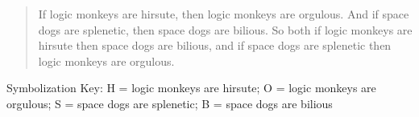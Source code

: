\documentclass[12pt]{article}
\begin{document}
\begin{enumerate}
\begin{quote}
If logic monkeys are hirsute, then logic monkeys are orgulous. And if space dogs are splenetic, then space dogs are bilious. So both if logic monkeys are hirsute then space dogs are bilious, and if space dogs are splenetic then logic monkeys are orgulous. 
\end{quote}

Symbolization Key: H = logic monkeys are hirsute; O = logic monkeys are orgulous; S = space dogs are splenetic; B = space dogs are bilious

\fi 






























\end{enumerate}
\end{document}
